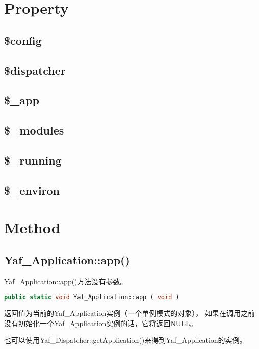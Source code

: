 \section{Property}


\subsection{\$config}
\subsection{\$dispatcher}
\subsection{\$\_app}
\subsection{\$\_modules}
\subsection{\$\_running}
\subsection{\$\_environ}

\section{Method}


\subsection{Yaf\_Application::app()}

Yaf\_Application::app()方法没有参数。

\begin{lstlisting}[language=PHP]
public static void Yaf_Application::app ( void )
\end{lstlisting}

返回值为当前的Yaf\_Application实例（一个单例模式的对象）， 如果在调用之前没有初始化一个Yaf\_Application实例的话，它将返回NULL。

也可以使用Yaf\_Dispatcher::getApplication()来得到Yaf\_Application的实例。











